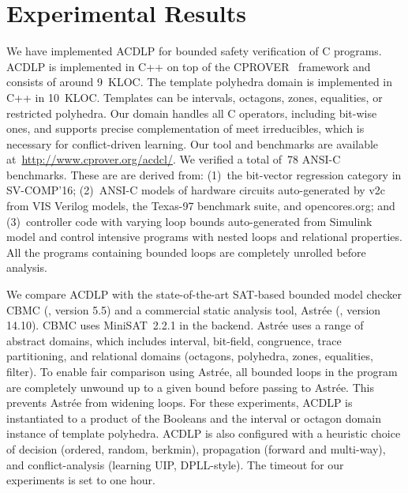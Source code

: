 \section{Experimental Results}
%
We have implemented ACDLP for bounded safety verification of C programs.  
ACDLP is implemented in C++ on top of the
\textsc{CPROVER}~\cite{cprover} framework and consists of around 9~KLOC. 
The template polyhedra domain is implemented in C++ in 10~KLOC.  Templates
can be intervals, octagons, zones, equalities, or restricted polyhedra.  Our
domain handles all C operators, including bit-wise ones, and supports
precise complementation of meet irreducibles, which is necessary for
conflict-driven learning.  Our tool and benchmarks are available 
at~\url{http://www.cprover.org/acdcl/}.
%
We verified a total of~78 ANSI-C benchmarks.  These are are derived from:
(1)~the bit-vector regression category in SV-COMP'16; (2)~ANSI-C models of
hardware circuits auto-generated by v2c~\cite{mtk2016} from VIS Verilog
models, the Texas-97 benchmark suite, and opencores.org; and (3)~controller 
code with varying loop bounds auto-generated from Simulink model and control 
intensive programs with nested loops and relational properties. 
All the programs containing bounded loops are completely unrolled before
analysis.

We compare ACDLP with the state-of-the-art SAT-based bounded model checker
CBMC (\cite{cbmc}, version 5.5) and a commercial static analysis tool,
Astr{\'e}e (\cite{astree}, version 14.10).  CBMC uses MiniSAT~2.2.1 in the
backend.  Astr{\'e}e uses a range of abstract domains, which includes
interval, bit-field, congruence, trace partitioning, and relational domains
(octagons, polyhedra, zones, equalities, filter).  To enable fair comparison
using Astr{\'e}e, all bounded loops in the program are completely unwound up
to a given bound before passing to Astr{\'e}e.  This prevents Astr{\'e}e
from widening loops.
%
For these experiments, ACDLP is instantiated to a product of the Booleans
and the interval or octagon domain instance of template polyhedra.  ACDLP is
also configured with a heuristic choice of decision (ordered, random, berkmin), 
propagation (forward and multi-way), and conflict-analysis (learning UIP, 
DPLL-style).  The timeout for our experiments is set to one hour.
%

